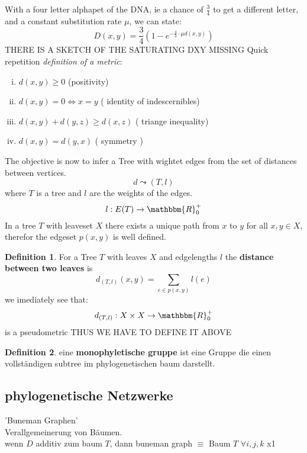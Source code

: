 \documentclass[a4paper]{article}
\theoremstyle{definition}
\newtheorem*{definition}{Definition}
\theoremstyle{remark}
\begin{document}
With a four letter alphapet of the DNA, ie a chance of $\frac{3}{4}$ to get a different letter, and a constant substitution rate $\mu$, we can state:
\begin{equation*}
	D(x,y)= \frac{3}{4}\left( 1- e^{-\frac{4}{3}\cdot \mu d(x,y)}\right)
\end{equation*}
THERE IS A SKETCH OF THE SATURATING DXY MISSING
Quick repetition \textit{definition of a metric}:
\begin{enumerate}[(i)]
	\item $d(x,y)\geq 0$ (positivity)
	\item	$d(x,y)=0 \Leftrightarrow x=y$ ( identity of indescernibles)
	\item $d(x,y) + d(y,z) \geq d(x,z)$ ( triange inequality)
	\item $d(x,y)=d(y,x)$ ( symmetry )
\end{enumerate}
The objective is now to infer a Tree with wightet edges from the set of distances between vertices.
\begin{equation*}
	d \leadsto (T,l)
\end{equation*}
where $T$ is a tree and  $l$ are the weights of the edges.
\begin{equation*}
	l: E(T) \rightarrow \mathbbm{R}^+_0
\end{equation*}
In a tree $T$ with leaveset $X$ there exists a unique path from $x$ to $y$ for all $x,y \in X$, therefor the edgeset $p(x,y)$ is well defined.
\begin{definition}
	For a Tree $T$ with leaves $X$ and edgelengths $l$ the \textbf{distance between two leaves} is 
	\begin{equation*}
		d_{(T,l)}(x,y)= \sum_{e\in p(x,y)} l(e)
	\end{equation*}
	we imediately see  that:
	\begin{equation*}
		 d_{(T,l)}:X\times X  \rightarrow  \mathbbm{R}^+_0
	\end{equation*}
	is a pseudometric  THUS WE HAVE TO DEFINE IT ABOVE
\end{definition}
\begin{definition}
	eine \textbf{monophyletische gruppe} ist eine Gruppe die einen vollständigen subtree im phylogenetischen baum darstellt.
\end{definition}
\subsection{phylogenetische Netzwerke}
\label{sub:phylogenetische_netzwerke}
'Buneman Graphen'\\
Verallgemeinerung von Bäumen.\\
wenn $D$ additiv zum baum $T$, dann buneman graph $\equiv$ Baum $T$ $ \forall i,j,k$
x1
\end{document}
